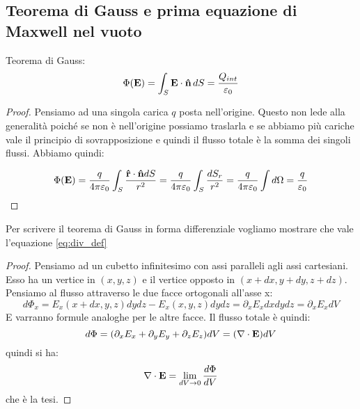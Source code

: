 
\subsection{Teorema di Gauss e prima equazione di Maxwell nel vuoto} %
\label{sub:teorema_di_gauss_e_prima_equazione_di_maxwell}


Teorema di Gauss:
\begin{equation} \label{eq:gauss_int} 
    \Phi ( \mathbf E ) = \int_S \mathbf{ E \cdot \hat n} \, dS = \frac{ Q_{int} }{ \varepsilon_0 } 
\end{equation}

\begin{proof}
    Pensiamo ad una singola carica $q$ posta nell'origine. Questo non lede alla generalità poiché se non è nell'origine possiamo traslarla e se abbiamo più cariche vale il principio di sovrapposizione e quindi il flusso totale è la somma dei singoli flussi. Abbiamo quindi:

    \begin{equation*}
        \Phi ( \mathbf E ) = \frac{q}{4 \pi \varepsilon_0 } \int_S \frac{ \mathbf{\hat r }  \cdot \mathbf{\hat n } dS }{ r^2 }
                        = \frac{q}{4 \pi \varepsilon_0 } \int_S \frac{ dS_r }{ r^2 } 
                        = \frac{q}{4 \pi \varepsilon_0 } \int d\Omega
                        = \frac{q}{\varepsilon_0 }
    \end{equation*}

\end{proof}

Per scrivere il teorema di Gauss in forma differenziale vogliamo mostrare che vale l'equazione \ref{eq:div_def}
\begin{proof}
    Pensiamo ad un cubetto infinitesimo con assi paralleli agli assi cartesiani. Esso ha un vertice in $(x, y, z)$ e il vertice opposto in $(x + dx, y + dy, z + dz)$. Pensiamo al flusso attraverso le due facce ortogonali all'asse x:
    \begin{equation*}
        d\Phi_x = E_x(x + dx, y, z) dydz - E_x(x, y, z) dydz = \partial_x E_x dxdydz = \partial_x E_x dV
    \end{equation*}
    E varranno formule analoghe per le altre facce. Il flusso totale è quindi:
    \begin{equation*}
        d\Phi = (\partial_x E_x + \partial_y E_y + \partial_z E_z) dV = (\nabla \cdot \mathbf E ) dV
    \end{equation*}
    quindi si ha:
    \begin{equation*}
        \nabla \cdot \mathbf E 
        = \lim_{ dV \to 0 } \frac{ d\Phi }{ dV }
    \end{equation*}
    che è la tesi.
\end{proof}

